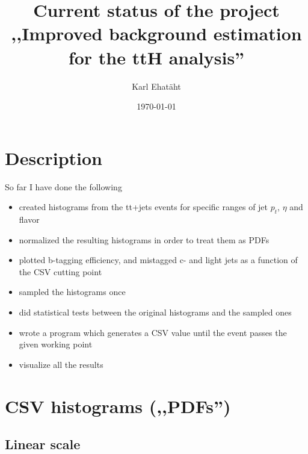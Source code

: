 \documentclass[12pt,a4paper]{article}
\title{\TitleFont\textbf{Current status of the project\\
,,Improved background estimation for the ttH analysis''}}
\author{Karl Ehatäht}
\date\today
\begin{document}
\maketitle

\section{Description}

So far I have done the following
\begin{itemize}
\item created histograms from the tt+jets events for specific ranges of jet $p_t$, $\eta$ and flavor
\item normalized the resulting histograms in order to treat them as PDFs
\item plotted b-tagging efficiency, and mistagged c- and light jets as a function of the CSV cutting point
\item sampled the histograms once
\item did statistical tests between the original histograms and the sampled ones
\item wrote a program which generates a CSV value until the event passes the given working point
\item visualize all the results
\end{itemize}

\section{CSV histograms (,,PDFs'')}
\subsection{Linear scale}
\begin{figure}[H]



\end{figure}
\end{document}
